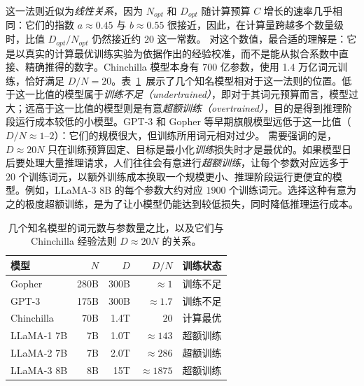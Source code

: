 这一法则近似为\emph{线性关系}，因为 $N_{opt}$ 和 $D_{opt}$ 随计算预算 $C$ 增长的速率几乎相同：它们的指数 $a \approx 0.45$ 与 $b \approx 0.55$ 很接近，因此，在计算量跨越多个数量级时，比值 $D_{opt}/N_{opt}$ 仍然接近约 $20$ 这一常数。
对这个数值，最合适的理解是：它是以真实的计算最优训练实验为依据作出的经验校准，而不是能从拟合系数中直接、精确推得的数字。Chinchilla 模型本身有 700 亿参数，使用 1.4 万亿词元训练，恰好满足 $D/N = 20$。表~\ref{tab:token-param}~展示了几个知名模型相对于这一法则的位置。低于这一比值的模型属于\emph{训练不足（undertrained）}，即对于其词元预算而言，模型过大；远高于这一比值的模型则是有意\emph{超额训练（overtrained）}，目的是得到推理阶段运行成本较低的小模型。GPT-3 和 Gopher 等早期旗舰模型远低于这一比值（$D/N \approx 1$--$2$）：它们的规模很大，但训练所用词元相对过少。
需要强调的是，$D \approx 20N$ 只在训练预算固定、目标是最小化\emph{训练}损失时才是最优的。如果模型日后要处理大量推理请求，人们往往会有意进行\emph{超额训练}，让每个参数对应远多于 $20$ 个训练词元，以额外训练成本换取一个规模更小、推理阶段运行更便宜的模型。例如，LLaMA-3 8B 的每个参数大约对应 $1900$ 个训练词元。选择这种有意为之的极度超额训练，是为了让小模型仍能达到较低损失，同时降低推理运行成本。

\begin{table}
    \centering
    \begin{tabular}{lrrrl}
        \toprule
        模型 & $N$ & $D$ & $D/N$ & 训练状态 \\
        \midrule
        Gopher \citep{rae2021scaling}            & 280B & 300B & $\approx 1$    & 训练不足 \\
        GPT-3 \citep{brown2020language}          & 175B & 300B & $\approx 1.7$  & 训练不足 \\
        Chinchilla \citep{10.5555/3600270.3602446} & 70B  & 1.4T & $20$           & 计算最优 \\
        LLaMA-1 7B \citep{touvron2023llama1}     & 7B   & 1.0T & $\approx 143$  & 超额训练 \\
        LLaMA-2 7B \citep{touvron2023llama}      & 7B   & 2.0T & $\approx 286$  & 超额训练 \\
        LLaMA-3 8B \citep{grattafiori2024llama3herdmodels} & 8B   & 15T  & $\approx 1875$ & 超额训练 \\
        \bottomrule
    \end{tabular}
    \caption{几个知名模型的词元数与参数量之比，以及它们与 Chinchilla 经验法则 $D \approx 20N$ 的关系。}
    \label{tab:token-param}
\end{table}

